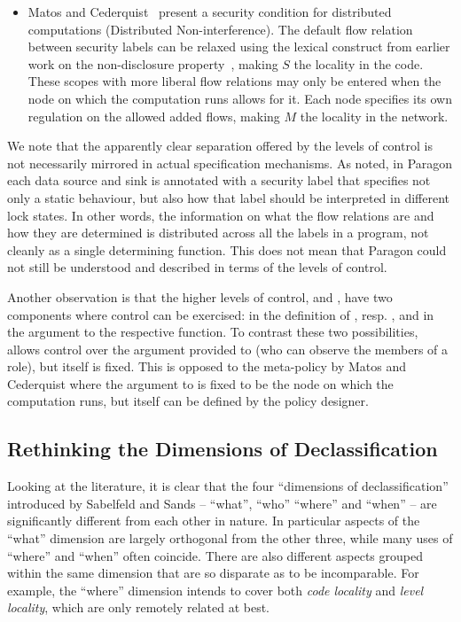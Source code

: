 \begin{itemize}
  \item Matos and Cederquist~\cite{Matos2014} present a security condition for distributed computations 
        (Distributed Non-interference). The default flow relation between security labels can be relaxed
        using the lexical construct from earlier work on the non-disclosure property~\cite{Boudol:Matos:On},
        making $S$ the locality in the code.
        These scopes with more liberal flow relations may only be entered when the node on which the 
        computation runs allows for it. Each node specifies its own regulation on the allowed added flows,
        making $M$ the locality in the network.
  
\end{itemize}

We note that the apparently clear separation offered by the levels of control is not necessarily mirrored 
in actual specification mechanisms. As noted, in Paragon each data source and sink is annotated with a
security label that specifies not only a static behaviour, but also how that label should be interpreted
in different lock states. In other words, the information on what the flow relations are and how they are
determined is distributed across all the labels in a program, not cleanly as a single determining function.
This does not mean that Paragon could not still be understood and described in terms of the levels of control.


Another observation is that the higher levels of control, \dynamicpol{} and \metapol{}, have two components
where control can be exercised: in the definition of \dynamicpol{}, resp. \metapol{}, and in the argument
to the respective function. To contrast these two possibilities, \Rx{} allows control over the argument
provided to \metapol{} (who can observe the members of a role), but \metapol{} itself is fixed.
This is opposed to the meta-policy by Matos and Cederquist where the argument to \metapol{} is fixed to
be the node on which the computation runs, but \metapol{} itself can be defined by the policy designer.

\subsection{Rethinking the Dimensions of Declassification}
\label{sec:pollang:reclassify}

Looking at the literature, it is clear that the four ``dimensions of declassification'' introduced
by Sabelfeld and Sands \cite{Sabelfeld:Sands:JCS} -- ``what'', ``who'' ``where'' and ``when'' --
are significantly different from each other in nature.
In particular aspects of the ``what'' dimension are largely orthogonal from the other three,
while many uses of ``where'' and ``when'' often coincide. There are also
different aspects grouped within the same dimension that are so disparate as to be incomparable.
For example, the ``where'' dimension intends to cover both \emph{code locality} and \emph{level locality},
which are only remotely related at best.

